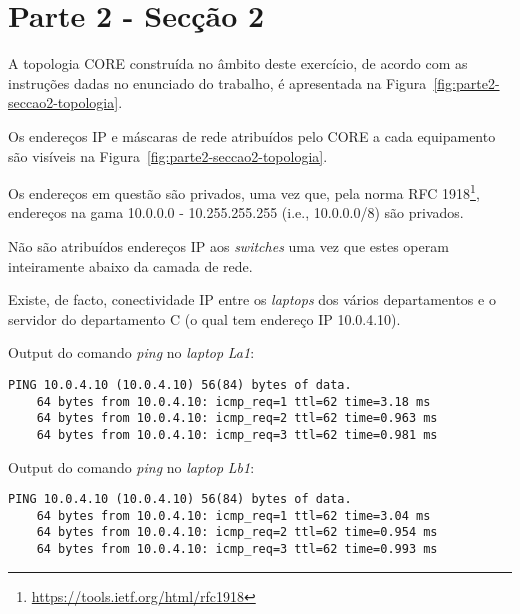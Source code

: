 
\section*{Parte 2 - Secção 2}


A topologia CORE construída no âmbito deste exercício, de acordo com as
instruções dadas no enunciado do trabalho, é apresentada na
Figura~\ref{fig:parte2-seccao2-topologia}.


Os endereços IP e máscaras de rede atribuídos pelo CORE a cada equipamento são
visíveis na Figura~\ref{fig:parte2-seccao2-topologia}.


Os endereços em questão são privados, uma vez que, pela norma RFC
1918\footnote{\url{https://tools.ietf.org/html/rfc1918}}, endereços na gama
10.0.0.0 - 10.255.255.255 (i.e., 10.0.0.0/8) são privados.


Não são atribuídos endereços IP aos \emph{switches} uma vez que estes operam
inteiramente abaixo da camada de rede.


Existe, de facto, conectividade IP entre os \emph{laptops} dos vários
departamentos e o servidor do departamento C (o qual tem endereço IP 10.0.4.10).

Output do comando \emph{ping} no \emph{laptop} \emph{La1}:

\begin{Verbatim}[fontsize=\scriptsize]
    PING 10.0.4.10 (10.0.4.10) 56(84) bytes of data.
    64 bytes from 10.0.4.10: icmp_req=1 ttl=62 time=3.18 ms
    64 bytes from 10.0.4.10: icmp_req=2 ttl=62 time=0.963 ms
    64 bytes from 10.0.4.10: icmp_req=3 ttl=62 time=0.981 ms
\end{Verbatim}

Output do comando \emph{ping} no \emph{laptop} \emph{Lb1}:

\begin{Verbatim}[fontsize=\scriptsize]
    PING 10.0.4.10 (10.0.4.10) 56(84) bytes of data.
    64 bytes from 10.0.4.10: icmp_req=1 ttl=62 time=3.04 ms
    64 bytes from 10.0.4.10: icmp_req=2 ttl=62 time=0.954 ms
    64 bytes from 10.0.4.10: icmp_req=3 ttl=62 time=0.993 ms
\end{Verbatim}

